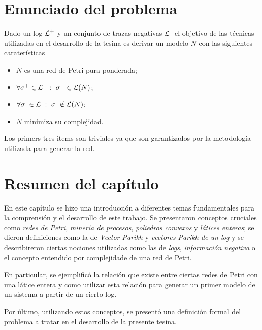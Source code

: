 \section{Enunciado del problema} 
\label{sec:2.problem}

Dado un log ${\mathcal L}\textsuperscript{+}$ y un conjunto de trazas negativas ${\mathcal L}\textsuperscript{-}$ el objetivo de las técnicas utilizadas 
en el desarrollo de la tesina es derivar un modelo $N$ con las siguientes caraterísticas\\

\begin{itemize}
 \item $N$ es una red de Petri pura ponderada;
 \item $\forall \sigma\textsuperscript{+} \in {\mathcal L}\textsuperscript{+}:~ \sigma\textsuperscript{+} \in \mathcal{L}(N)$;
 \item $\forall \sigma\textsuperscript{-} \in {\mathcal L}\textsuperscript{-}:~ \sigma\textsuperscript{-} \notin \mathcal{L}(N)$;
 \item $N$ minimiza su complejidad.\\
\end{itemize}

Los primers tres items son triviales ya que son garantizados por la metodología utilizada
para generar la red.

\section{Resumen del capítulo}
\label{sec:2.resumen}
En este capítulo se hizo una introducción a diferentes temas fundamentales para la comprensión y el desarrollo de este trabajo. 
Se presentaron conceptos cruciales como \textit{redes de Petri}, \textit{minería de procesos},
\textit{poliedros convexos} y \textit{látices enteras}; se dieron definiciones como la de \textit{Vector Parikh} 
y \textit{vectores Parikh de un log} y se describireron ciertas nociones 
utilizadas como las de \textit{logs}, \textit{información negativa} 
o el concepto  entendido por complejidade de una red de Petri.

En particular, se ejemplificó la relación que existe entre ciertas redes de Petri con una látice entera y 
como utilizar esta relación para generar un primer modelo de un sistema a partir de un cierto log.

Por último, utilizando estos conceptos, se presentó una definición formal del problema a tratar en el desarrollo
 de la presente tesina. 
